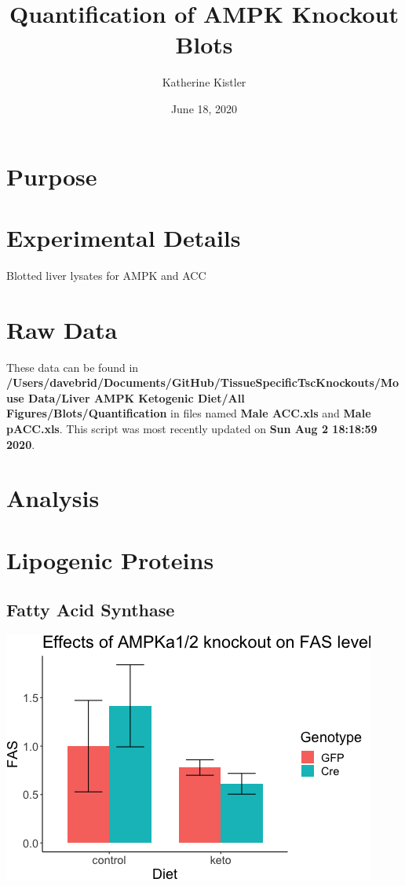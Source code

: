 \documentclass[]{article}
\title{Quantification of AMPK Knockout Blots}
\author{Katherine Kistler}
\date{June 18, 2020}
\begin{document}
\maketitle

{
\setcounter{tocdepth}{2}
\tableofcontents
}
\hypertarget{purpose}{%
\section{Purpose}\label{purpose}}

\hypertarget{experimental-details}{%
\section{Experimental Details}\label{experimental-details}}

Blotted liver lysates for AMPK and ACC

\hypertarget{raw-data}{%
\section{Raw Data}\label{raw-data}}

These data can be found in
\textbf{/Users/davebrid/Documents/GitHub/TissueSpecificTscKnockouts/Mouse
Data/Liver AMPK Ketogenic Diet/All Figures/Blots/Quantification} in
files named \textbf{Male ACC.xls} and \textbf{Male pACC.xls}. This
script was most recently updated on \textbf{Sun Aug 2 18:18:59 2020}.

\hypertarget{analysis}{%
\section{Analysis}\label{analysis}}

\hypertarget{lipogenic-proteins}{%
\section{Lipogenic Proteins}\label{lipogenic-proteins}}

\hypertarget{fatty-acid-synthase}{%
\subsection{Fatty Acid Synthase}\label{fatty-acid-synthase}}

\includegraphics{figures/fas-barplot-1.png}
\end{document}
